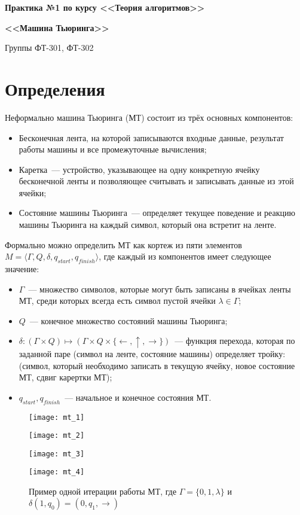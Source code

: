 \documentclass[
    11pt,
    a4paper
]{article}
\theoremstyle{definition}
\begin{document}
\centerline{\Large \bf Практика №1 по курсу <<Теория алгоритмов>>}
\centerline{\Large \bf <<Машина Тьюринга>>}
\centerline{Группы ФТ-301, ФТ-302}

\section{Определения}
Неформально машина Тьюринга (МТ) состоит из трёх основных компонентов: 
\begin{itemize}
\item Бесконечная лента, на которой записываются входные данные, результат работы машины и все промежуточные вычисления;
\item Каретка~--- устройство, указывающее на одну конкретную ячейку бесконечной ленты и позволяющее считывать и записывать данные из этой ячейки;
\item Состояние машины Тьюринга~--- определяет текущее поведение и реакцию машины Тьюринга на каждый символ, который она встретит на ленте.
\end{itemize}

Формально можно определить МТ как кортеж из пяти элементов $M = \langle \Gamma, Q, \delta, q_{start}, q_{finish} \rangle$, где каждый из компонентов имеет следующее значение:
\begin{itemize}
\item $\Gamma$~--- множество символов, которые могут быть записаны в ячейках ленты МТ, среди которых всегда есть символ пустой ячейки $\lambda \in \Gamma$;
\item $Q$~--- конечное множество состояний машины Тьюринга;
\item $\delta: (\Gamma \times Q) \mapsto (\Gamma \times Q \times \{\leftarrow, \uparrow, \rightarrow\})$~--- функция перехода, которая по заданной паре (символ на ленте, состояние машины) определяет тройку: (символ, который необходимо записать в текущую ячейку, новое состояние МТ, сдвиг карертки МТ);
\item $q_{start}, q_{finish}$~--- начальное и конечное состояния МТ.
\end{itemize}

\begin{figure}[h!]
\centering
\texttt{[image: mt\_1]}

\vspace{0.5cm}

\texttt{[image: mt\_2]}

\vspace{0.5cm}

\texttt{[image: mt\_3]}

\vspace{0.5cm}

\texttt{[image: mt\_4]}
\caption{Пример одной итерации работы МТ, где $\Gamma = \{0, 1, \lambda\}$ и $\delta(1 , q_0) = (0, q_1, \rightarrow)$}
\end{figure}
\end{document}
